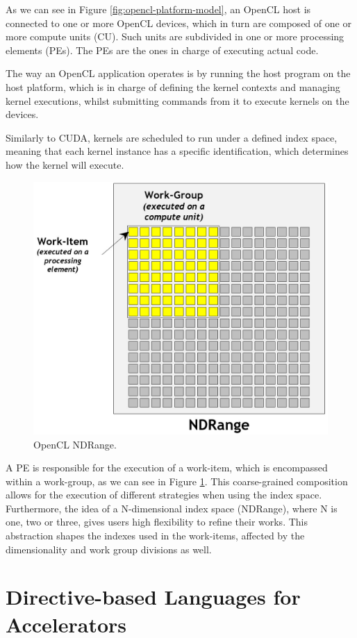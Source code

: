 As we can see in Figure \ref{fig:opencl-platform-model}, an OpenCL host is connected to one or more OpenCL devices, which in turn are composed of one or more compute units (CU).
Such units are subdivided in one or more processing elements (PEs).
The PEs are the ones in charge of executing actual code.

The way an OpenCL application operates is by running the host program on the host platform, which is in charge of defining the kernel contexts and managing kernel executions, whilst submitting commands from it to execute kernels on the devices.

Similarly to CUDA, kernels are scheduled to run under a defined index space, meaning that each kernel instance has a specific identification, which determines how the kernel will execute.

\begin{figure}[H]
	\centering
	\includegraphics[width=0.75\linewidth]{images/opencl-ndrange.jpg}
	\caption{OpenCL NDRange.}
	\label{fig:opencl-ndrange}
\end{figure}

A PE is responsible for the execution of a work-item, which is encompassed within a work-group, as we can see in Figure \ref{fig:opencl-ndrange}.
This coarse-grained composition allows for the execution of different strategies when using the index space.
Furthermore, the idea of a N-dimensional index space (NDRange), where N is one, two or three, gives users high flexibility to refine their works.
This abstraction shapes the indexes used in the work-items, affected by the dimensionality and work group divisions as well.

\section{Directive-based Languages for Accelerators}

